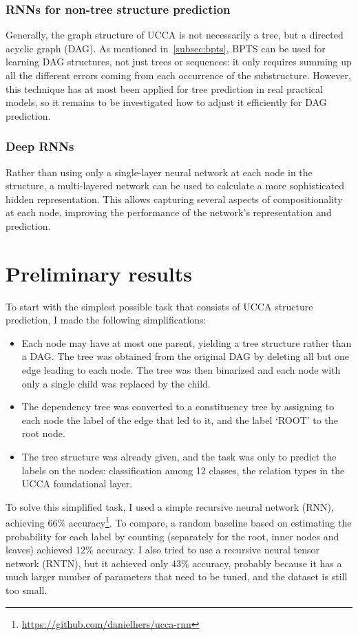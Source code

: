 \documentclass[11pt]{article}
\begin{document}
\subsubsection{RNNs for non-tree structure prediction}

Generally, the graph structure of UCCA is not necessarily a tree, but a directed acyclic graph (DAG). As mentioned in~\ref{subsec:bpts}, BPTS can be used for learning DAG structures, not just trees or sequences\cite{goller1996learning}: it only requires summing up all the different errors coming from each occurrence of the substructure. However, this technique has at most been applied for tree prediction in real practical models, so it remains to be investigated how to adjust it efficiently for DAG prediction.


\subsubsection{Deep RNNs}

Rather than using only a single-layer neural network at each node in the structure, a multi-layered network can be used to calculate a more sophisticated hidden representation\cite{irsoy2014deep}. This allows capturing several aspects of compositionality at each node, improving the performance of the network's representation and prediction.



\section{Preliminary results}

To start with the simplest possible task that consists of UCCA structure prediction, I made the following simplifications:
\begin{itemize}
  \item Each node may have at most one parent, yielding a tree structure rather than a DAG. The tree was obtained from the original DAG by deleting all but one edge leading to each node. The tree was then binarized and each node with only a single child was replaced by the child.
  \item The dependency tree was converted to a constituency tree by assigning to each node the label of the edge that led to it, and the label `ROOT' to the root node.
  \item The tree structure was already given, and the task was only to predict the labels on the nodes: classification among 12 classes, the relation types in the UCCA foundational layer.
\end{itemize}
To solve this simplified task, I used a simple recursive neural network (RNN)\cite{socher2010learning}, achieving $66\%$ accuracy\footnote{\url{https://github.com/danielhers/ucca-rnn}}. To compare, a random baseline based on estimating the probability for each label by counting (separately for the root, inner nodes and leaves) achieved $12\%$ accuracy. I also tried to use a recursive neural tensor network (RNTN)\cite{socher2013recursive}, but it achieved only $43\%$ accuracy, probably because it has a much larger number of parameters that need to be tuned, and the dataset is still too small.
\end{document}
